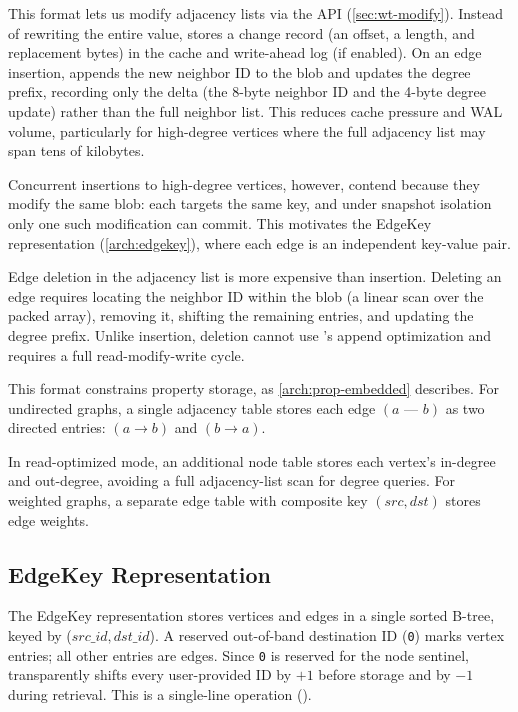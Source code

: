 This format lets us modify adjacency lists via the  API (\autoref{sec:wt-modify}).
Instead of rewriting the entire value,  stores a change record (an offset, a length, and replacement bytes) in the \wt{} cache and write-ahead log (if enabled).
On an edge insertion,  appends the new neighbor ID to the blob and updates the degree prefix, recording only the delta (the 8-byte neighbor ID and the 4-byte degree update) rather than the full neighbor list.
This reduces cache pressure and WAL volume, particularly for high-degree vertices where the full adjacency list may span tens of kilobytes.

Concurrent insertions to high-degree vertices, however, contend because they modify the same blob: each  targets the same key, and under snapshot isolation only one such modification can commit.
This motivates the EdgeKey representation (\autoref{arch:edgekey}), where each edge is an independent key-value pair.

Edge deletion in the adjacency list is more expensive than insertion.
Deleting an edge requires locating the neighbor ID within the blob (a linear scan over the packed array), removing it, shifting the remaining entries, and updating the degree prefix.
Unlike insertion, deletion cannot use 's append optimization and requires a full read-modify-write cycle.

This format constrains property storage, as \autoref{arch:prop-embedded} describes.
For undirected graphs, a single adjacency table stores each edge $(a\text{ --- }b)$ as two directed entries: $(a \rightarrow b)$ and $(b \rightarrow a)$.

In read-optimized mode, an additional node table stores each vertex's in-degree and out-degree, avoiding a full adjacency-list scan for degree queries.
For weighted graphs, a separate edge table with composite key $(src, dst)$ stores edge weights.



\subsection{EdgeKey Representation}
\label{arch:edgekey}
The EdgeKey representation stores vertices and edges in a single sorted B-tree, keyed by ($src\_id, dst\_id$).
A reserved out-of-band destination ID (\texttt{0}) marks vertex entries; all other entries are edges.
Since \texttt{0} is reserved for the node sentinel, \project{} transparently shifts every user-provided ID by $+1$ before storage and by $-1$ during retrieval.
This is a single-line operation ().

